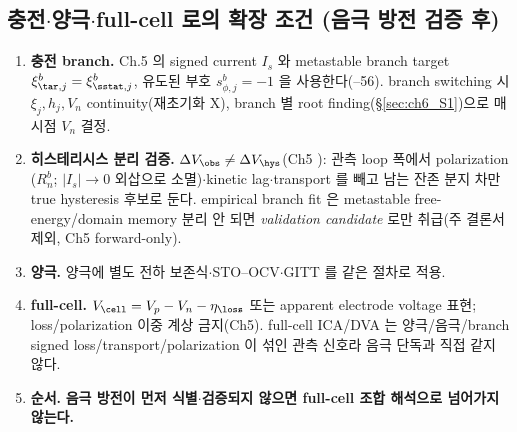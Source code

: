 \subsection{충전$\cdot$양극$\cdot$full-cell 로의 확장 조건 (음극 방전 검증 후)}\label{sec:ch6_extension}
\begin{enumerate}[label=E\arabic*),leftmargin=2.4em]
\item \textbf{충전 branch.} Ch.5 의 signed current $I_s$ 와 metastable branch target $\xi_{\tar,j}^b=\xi_{\sstat,j}^b$,
  유도된 부호 $s_{\phi,j}^b=-1$ 을 사용한다(--56). branch switching 시 $\xi_j,h_j,V_n$ continuity(재초기화 X),
  branch 별 root finding(\S\ref{sec:ch6_S1})으로 매 시점 $V_n$ 결정.
\item \textbf{히스테리시스 분리 검증.} $\Delta V_\obs\ne\Delta V_\hys$(Ch5 ): 관측 loop 폭에서 polarization
  ($R_n^b$; $|I_s|\to0$ 외삽으로 소멸)$\cdot$kinetic lag$\cdot$transport 를 빼고 남는 잔존 분지 차만 true
  hysteresis 후보로 둔다. empirical branch fit 은 metastable free-energy/domain memory 분리 안 되면 \emph{validation
  candidate} 로만 취급(주 결론서 제외, Ch5 forward-only).
\item \textbf{양극.} 양극에 별도 전하 보존식$\cdot$STO--OCV$\cdot$GITT 를 같은 절차로 적용.
\item \textbf{full-cell.} $V_\cell=V_p-V_n-\eta_\loss$ 또는 apparent electrode voltage 표현; loss/polarization
  이중 계상 금지(Ch5). full-cell ICA/DVA 는 양극/음극/branch signed loss/transport/polarization 이 섞인 관측
  신호라 음극 단독과 직접 같지 않다.
\item \textbf{순서.} \textbf{음극 방전이 먼저 식별$\cdot$검증되지 않으면 full-cell 조합 해석으로 넘어가지 않는다.}
\end{enumerate}

